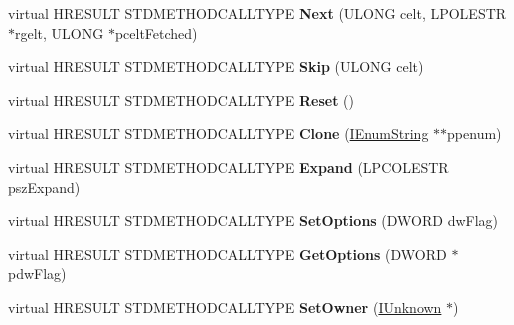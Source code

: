 \begin{DoxyCompactItemize}
\item 
\mbox{\label{class_c_a_c_list_i_s_f_a395ef028984cc1585dcd4e9696a366fc}} 
virtual H\+R\+E\+S\+U\+LT S\+T\+D\+M\+E\+T\+H\+O\+D\+C\+A\+L\+L\+T\+Y\+PE {\bfseries Next} (U\+L\+O\+NG celt, L\+P\+O\+L\+E\+S\+TR $\ast$rgelt, U\+L\+O\+NG $\ast$pcelt\+Fetched)
\item 
\mbox{\label{class_c_a_c_list_i_s_f_a08e49de8ababaeb6f2c10215956e5b82}} 
virtual H\+R\+E\+S\+U\+LT S\+T\+D\+M\+E\+T\+H\+O\+D\+C\+A\+L\+L\+T\+Y\+PE {\bfseries Skip} (U\+L\+O\+NG celt)
\item 
\mbox{\label{class_c_a_c_list_i_s_f_a9376c40cd08b6b891b21172680903c14}} 
virtual H\+R\+E\+S\+U\+LT S\+T\+D\+M\+E\+T\+H\+O\+D\+C\+A\+L\+L\+T\+Y\+PE {\bfseries Reset} ()
\item 
\mbox{\label{class_c_a_c_list_i_s_f_ab442128b199f1603344ac8d4f86e7a4c}} 
virtual H\+R\+E\+S\+U\+LT S\+T\+D\+M\+E\+T\+H\+O\+D\+C\+A\+L\+L\+T\+Y\+PE {\bfseries Clone} (\hyperlink{interface_i_enum_string}{I\+Enum\+String} $\ast$$\ast$ppenum)
\item 
\mbox{\label{class_c_a_c_list_i_s_f_ae24934bbafa593488a04b0342010526d}} 
virtual H\+R\+E\+S\+U\+LT S\+T\+D\+M\+E\+T\+H\+O\+D\+C\+A\+L\+L\+T\+Y\+PE {\bfseries Expand} (L\+P\+C\+O\+L\+E\+S\+TR psz\+Expand)
\item 
\mbox{\label{class_c_a_c_list_i_s_f_a6773494472a4ceac907bd56289273892}} 
virtual H\+R\+E\+S\+U\+LT S\+T\+D\+M\+E\+T\+H\+O\+D\+C\+A\+L\+L\+T\+Y\+PE {\bfseries Set\+Options} (D\+W\+O\+RD dw\+Flag)
\item 
\mbox{\label{class_c_a_c_list_i_s_f_a2b1bbf94a31693fe1bbb56ade7de35d5}} 
virtual H\+R\+E\+S\+U\+LT S\+T\+D\+M\+E\+T\+H\+O\+D\+C\+A\+L\+L\+T\+Y\+PE {\bfseries Get\+Options} (D\+W\+O\+RD $\ast$pdw\+Flag)
\item 
\mbox{\label{class_c_a_c_list_i_s_f_a1732cc3ecd9e11a8080c3c43c519067d}} 
virtual H\+R\+E\+S\+U\+LT S\+T\+D\+M\+E\+T\+H\+O\+D\+C\+A\+L\+L\+T\+Y\+PE {\bfseries Set\+Owner} (\hyperlink{interface_i_unknown}{I\+Unknown} $\ast$)
$$
\end{DoxyCompactItemize}
